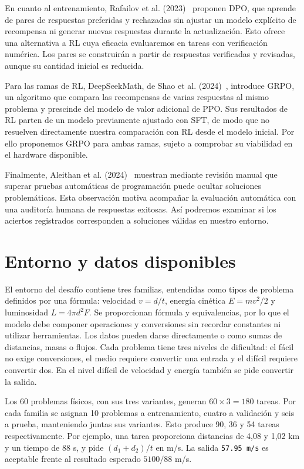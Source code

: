 En cuanto al entrenamiento, Rafailov et al. (2023)~\cite{dpo} proponen DPO,
que aprende de pares de respuestas preferidas y rechazadas sin ajustar un modelo
explícito de recompensa ni generar nuevas respuestas durante la actualización.
Esto ofrece una alternativa a RL cuya eficacia evaluaremos en tareas con
verificación numérica. Los pares se construirán a partir de respuestas verificadas
y revisadas, aunque su cantidad inicial es reducida.

Para las ramas de RL, DeepSeekMath, de Shao et al. (2024)~\cite{deepseekmath},
introduce GRPO, un algoritmo que
compara las recompensas de varias respuestas al mismo problema y prescinde del
modelo de valor adicional de PPO. Sus resultados de RL parten de un modelo
previamente ajustado con SFT, de modo que no resuelven directamente nuestra
comparación con RL desde el modelo inicial. Por ello proponemos GRPO para ambas
ramas, sujeto a comprobar su viabilidad en el hardware disponible.

Finalmente, Aleithan et al. (2024)~\cite{swebenchplus} muestran mediante revisión
manual que superar pruebas automáticas de programación puede ocultar soluciones
problemáticas. Esta observación motiva acompañar la evaluación automática con
una auditoría humana de respuestas exitosas. Así podremos examinar si los
aciertos registrados corresponden a soluciones válidas en nuestro entorno.

\section{Entorno y datos disponibles}
El entorno del desafío contiene tres familias, entendidas como
tipos de problema definidos por una fórmula: velocidad $v=d/t$, energía cinética
$E=mv^2/2$ y luminosidad $L=4\pi d^2F$. Se proporcionan fórmula y equivalencias,
por lo que el modelo debe componer operaciones y conversiones sin recordar
constantes ni utilizar herramientas. Los datos pueden darse directamente o como
sumas de distancias, masas o flujos. Cada problema tiene tres niveles de
dificultad: el fácil no exige conversiones, el medio requiere convertir una
entrada y el difícil requiere convertir dos. En el nivel difícil de velocidad
y energía también se pide convertir la salida.

Los 60 problemas físicos, con sus tres variantes, generan $60\times3=180$ tareas.
Por cada familia se
asignan 10 problemas a entrenamiento, cuatro a validación y seis a prueba,
manteniendo juntas sus variantes. Esto produce 90, 36 y 54 tareas respectivamente.
Por ejemplo, una tarea proporciona distancias de 4,08 y 1,02 km y un tiempo
de 88 s, y pide $(d_1+d_2)/t$ en m/s. La salida \verb|57.95 m/s| es aceptable
frente al resultado esperado $5100/88$ m/s.

